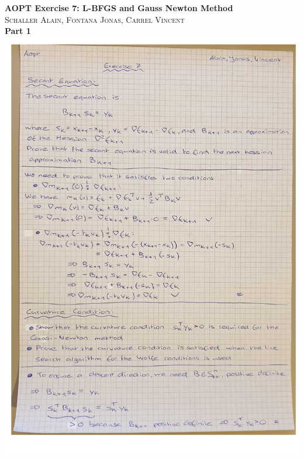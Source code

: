 \documentclass[multi=page,crop,border=15pt,varwidth=120cm]{standalone}
\begin{document}


\begin{page}%
    \textbf{\LARGE{AOPT Exercise 7}: L-BFGS and Gauss Newton Method}\\[6pt]
    \textsc{Schaller Alain, Fontana Jonas, Carrel Vincent}\\[18pt]
    \textbf{\LARGE{Part 1}}\\[12pt]

    \hspace*{-0.2in}
    \includegraphics{../part1}
    \hspace*{-0.2in}
\end{page}
\end{document}

